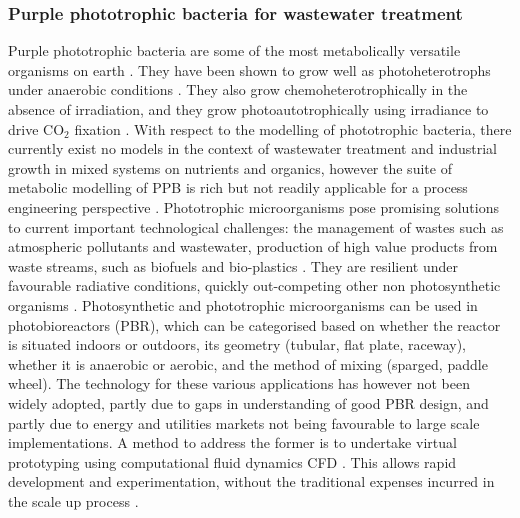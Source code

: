 \subsubsection{Purple phototrophic bacteria for wastewater treatment}
Purple phototrophic bacteria are some of the most metabolically versatile organisms on earth \cite{hunter2008}. They have been shown to grow well as photoheterotrophs under anaerobic conditions \cite{hulsen2014}. They also grow chemoheterotrophically in the absence of irradiation, and they grow photoautotrophically using irradiance to drive $\mathrm{CO_2}$ fixation \cite{gordon2014}. With respect to the modelling of phototrophic bacteria, there currently exist no models in the context of wastewater treatment and industrial growth in mixed systems on nutrients and organics, however the suite of metabolic modelling of PPB is rich but not readily applicable for a process engineering perspective \cite{klamt2002}.
\skippingparagraph
Phototrophic microorganisms pose promising solutions to current important technological challenges: the management of wastes such as atmospheric pollutants and wastewater, production of high value products from waste streams, such as biofuels and bio-plastics \cite{hulsen2016}. They are resilient under favourable radiative conditions, quickly out-competing other non photosynthetic organisms \cite{posten2009}. Photosynthetic and phototrophic microorganisms can be used in photobioreactors (PBR), which can be categorised based on whether the reactor is situated indoors or outdoors, its geometry (tubular, flat plate, raceway), whether it is anaerobic or aerobic, and the method of mixing (sparged, paddle wheel). The technology for these various applications has however not been widely adopted, partly due to gaps in understanding of good PBR design, and partly due to energy and utilities markets not being favourable to large scale implementations. A method to address the former is to undertake virtual prototyping using computational fluid dynamics CFD \cite{bitog2011}. This allows rapid development and experimentation, without the traditional expenses incurred in the scale up process \cite{bridgeman2012}.


